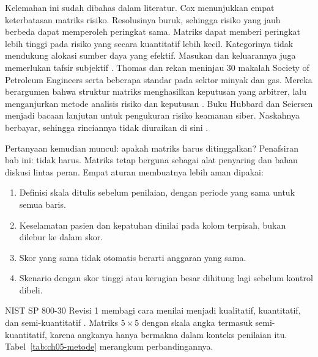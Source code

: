 Kelemahan ini sudah dibahas dalam literatur. Cox menunjukkan empat keterbatasan matriks risiko.
Resolusinya buruk, sehingga risiko yang jauh berbeda dapat memperoleh peringkat sama. Matriks dapat
memberi peringkat lebih tinggi pada risiko yang secara kuantitatif lebih kecil. Kategorinya tidak
mendukung alokasi sumber daya yang efektif. Masukan dan keluarannya juga memerlukan tafsir subjektif
\cite{c05-cox2008}. Thomas dan rekan meninjau 30 makalah Society of Petroleum Engineers serta beberapa
standar pada sektor minyak dan gas. Mereka berargumen bahwa struktur matriks menghasilkan keputusan
yang arbitrer, lalu menganjurkan metode analisis risiko dan keputusan \cite{c05-thomas2014}. Buku
Hubbard dan Seiersen menjadi bacaan lanjutan untuk pengukuran risiko keamanan siber. Naskahnya
berbayar, sehingga rinciannya tidak diuraikan di sini \cite{hubbard2023}.

Pertanyaan kemudian muncul: apakah matriks harus ditinggalkan? Penafsiran bab ini: tidak harus.
Matriks tetap berguna sebagai alat penyaring dan bahan diskusi lintas peran. Empat aturan membuatnya
lebih aman dipakai:
\begin{enumerate}
  \item Definisi skala ditulis sebelum penilaian, dengan periode yang sama untuk semua baris.
  \item Keselamatan pasien dan kepatuhan dinilai pada kolom terpisah, bukan dilebur ke dalam skor.
  \item Skor yang sama tidak otomatis berarti anggaran yang sama.
  \item Skenario dengan skor tinggi atau kerugian besar dihitung lagi sebelum kontrol dibeli.
\end{enumerate}

NIST SP 800-30 Revisi 1 membagi cara menilai menjadi kualitatif, kuantitatif, dan semi-kuantitatif
\cite{c05-nist-sp80030r1}. Matriks $5 \times 5$ dengan skala angka termasuk semi-kuantitatif, karena
angkanya hanya bermakna dalam konteks penilaian itu. Tabel~\ref{tab:ch05-metode} merangkum
perbandingannya.

